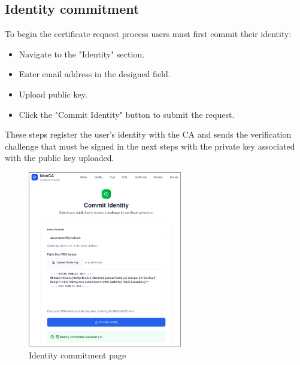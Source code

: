 \subsection{Identity commitment}
To begin the certificate request process users must first commit their identity:
\begin{itemize}
    \item Navigate to the "Identity" section.
    \item Enter email address in the designed field.
    \item Upload public key.
    \item Click the "Commit Identity" button to submit the request.
\end{itemize}
These steps register the user's identity with the CA and sends the verification challenge that must 
be signed in the next steps with the private key associated with the public key uploaded.
\begin{figure}[h!]
    \centering
    \includegraphics[keepaspectratio, width=0.6\textwidth]{Pic/2_identity_committed.png}
    \caption{Identity commitment page}
    \label{fig:identity-commitment}
\end{figure}


